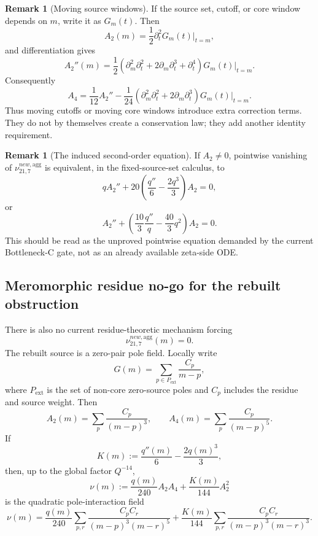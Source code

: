 \documentclass[11pt,a4paper]{amsart}
\def\new{new}%
\theoremstyle{plain}
\theoremstyle{definition}
\newtheorem{remark}[theorem]{Remark}
\newcommand{\new}{\mathrm{new}}
\begin{document}
\begin{remark}[Moving source windows]
\label{rem:moving-source-windows-exactness-correction}
If the source set, cutoff, or core window depends on \(m\), write it as
\(G_m(t)\).  Then
\[
A_2(m)=\frac12\partial_t^2G_m(t)\big|_{t=m},
\]
and differentiation gives
\[
A_2''(m)
=
\frac12
\left(
\partial_m^2\partial_t^2
+
2\partial_m\partial_t^3
+
\partial_t^4
\right)G_m(t)\big|_{t=m}.
\]
Consequently
\[
A_4
=
\frac{1}{12}A_2''
-
\frac{1}{24}
\left(
\partial_m^2\partial_t^2
+
2\partial_m\partial_t^3
\right)G_m(t)\big|_{t=m}.
\]
Thus moving cutoffs or moving core windows introduce extra correction terms.
They do not by themselves create a conservation law; they add another
identity requirement.
\end{remark}

\begin{remark}[The induced second-order equation]
\label{rem:induced-second-order-equation-bc-defect}
If \(A_2\ne0\), pointwise vanishing of
\(\nu_{21,7}^{\new,\mathrm{agg}}\) is equivalent, in the fixed-source-set
calculus, to
\[
qA_2''
+
20
\left(
\frac{q''}{6}
-
\frac{2q^3}{3}
\right)A_2
=0,
\]
or
\[
A_2''
+
\left(
\frac{10}{3}\frac{q''}{q}
-
\frac{40}{3}q^2
\right)A_2
=0.
\]
This should be read as the unproved pointwise equation demanded by the current
Bottleneck-C gate, not as an already available zeta-side ODE.
\end{remark}

\subsection{Meromorphic residue no-go for the rebuilt obstruction}
\label{subsec:meromorphic-residue-no-go-rebuilt-obstruction}

There is also no current residue-theoretic mechanism forcing
\[
\nu_{21,7}^{\new,\mathrm{agg}}(m)=0.
\]
The rebuilt source is a zero-pair pole field.  Locally write
\[
G(m)
=
\sum_{p\in P_{\mathrm{ext}}}\frac{C_p}{m-p},
\]
where \(P_{\mathrm{ext}}\) is the set of non-core zero-source poles and
\(C_p\) includes the residue and source weight.  Then
\[
A_2(m)=\sum_p\frac{C_p}{(m-p)^3},
\qquad
A_4(m)=\sum_p\frac{C_p}{(m-p)^5}.
\]
If
\[
K(m):=\frac{q''(m)}{6}-\frac{2q(m)^3}{3},
\]
then, up to the global factor \(Q^{-14}\),
\[
\nu(m)
:=
\frac{q(m)}{240}A_2A_4+\frac{K(m)}{144}A_2^2
\]
is the quadratic pole-interaction field
\[
\nu(m)
=
\frac{q(m)}{240}
\sum_{p,r}
\frac{C_pC_r}{(m-p)^3(m-r)^5}
+
\frac{K(m)}{144}
\sum_{p,r}
\frac{C_pC_r}{(m-p)^3(m-r)^3}.
\]
\end{document}
